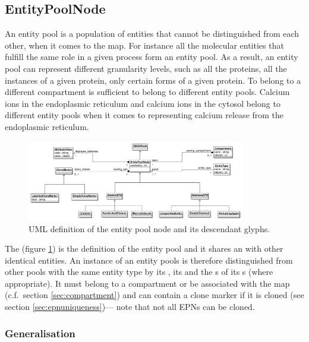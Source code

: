\subsection{EntityPoolNode}
\label{sec:EPNs}\label{defn:EntityPoolNode}\label{sec:EPN}

An entity pool is a population of entities that cannot be
distinguished from each other, when it comes to the \SBGNPDLone
map. For instance all the molecular entities that fulfill the same
role in a given process form an entity pool. As a result, an entity
pool can represent different granularity levels, such as all the
proteins, all the instances of a given protein, only certain forms of
a given protein. To belong to a different compartment is sufficient to
belong to different entity pools. Calcium ions in the endoplasmic
reticulum and calcium ions in the cytosol belong to different entity
pools when it comes to representing calcium release from the
endoplasmic reticulum.

\begin{figure}[htb]
  \centering
  \includegraphics[width=0.85\textwidth]{images/epnuml}
\caption{UML definition of the entity pool node and its descendant glyphs.}
  \label{fig:epnuml}
\end{figure}
 
The  (figure \ref{fig:epnuml}) is the
definition of the entity pool and it shares an 
with other identical entities. An instance of an entity pools is
therefore distinguished from other pools with the same entity type by
its , its  and the
s of its s (where
appropriate). It must belong to a compartment or be associated with
the map (c.f.\, section \ref{sec:compartment}) and can contain a clone
marker if it is cloned (see section \ref{sec:epnuniqueness})--- note
that not all EPNs can be cloned.

\subsubsection{Generalisation}

